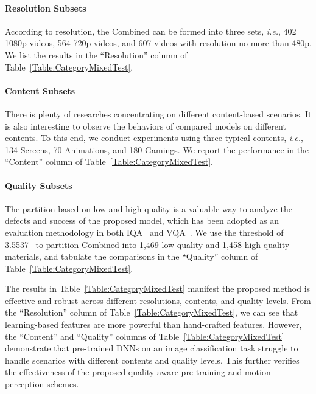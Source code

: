 \documentclass[journal]{IEEEtran}
\begin{document}
{{\paragraph{Resolution Subsets}\label{subsubsec:ResolutionCategoryMixedTest}
According to resolution, the Combined can be formed into three sets, \textit{i.e.}, 402 1080p-videos, 564 720p-videos, and 607 videos with resolution no more than 480p. We list the results in the ``Resolution'' column of Table~\ref{Table:CategoryMixedTest}.

\paragraph{Content Subsets}\label{subsubsec:ContentCategoryMixedTest}
There is plenty of researches concentrating on different content-based scenarios. It is also interesting to observe the behaviors of compared models on different contents. To this end, we conduct experiments using three typical contents, \textit{i.e.}, 134 Screens, 70 Animations, and 180 Gamings. We report the performance in the ``Content'' column of Table~\ref{Table:CategoryMixedTest}.

\paragraph{Quality Subsets}\label{subsubsec:QualityCategoryMixedTest}
The partition based on low and high quality is a valuable way to analyze the defects and success of the proposed model, which has been adopted as an evaluation methodology in both IQA~\cite{yu2019predicting} and VQA~\cite{tu2021ugc}. We use the threshold of 3.5537~\cite{tu2021ugc} to partition Combined into 1,469 low quality and 1,458 high quality materials, and tabulate the comparisons in the ``Quality'' column of Table~\ref{Table:CategoryMixedTest}.

The results in Table~\ref{Table:CategoryMixedTest} manifest the proposed method is effective and robust across different resolutions, contents, and quality levels. From the ``Resolution'' column of Table~\ref{Table:CategoryMixedTest}, we can see that learning-based features are more powerful than hand-crafted features. However, the ``Content'' and ``Quality'' columns of Table~\ref{Table:CategoryMixedTest} demonstrate that pre-trained DNNs on an image classification task struggle to handle scenarios with different contents and quality levels. This further verifies the effectiveness of the proposed quality-aware pre-training and motion perception schemes.

}}
\end{document}
